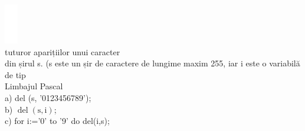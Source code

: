 \documentclass[10pt]{article}
\begin{document}
\includegraphics[max width=\textwidth, center]{2025_04_17_46e04c6acd873ea9558dg-021(3)}\\
tuturor aparițiilor unui caracter\\
din șirul s. (s este un șir de caractere de lungime maxim 255, iar i este o variabilă de tip\\
Limbajul Pascal\\
a) del (s, '0123456789');\\
b) $\operatorname{del}(\mathrm{s}, \mathrm{i})$;\\
c) for i:='0' to '9' do del(i,s);
\end{document}
